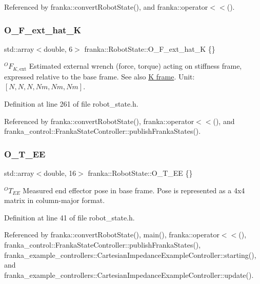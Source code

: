 Referenced by franka\+::convert\+Robot\+State(), and franka\+::operator$<$$<$().

\mbox{\label{structfranka_1_1RobotState_a5a830b4f9d6a3c2dc92e4a9cc6050493}} 
\subsubsection{\texorpdfstring{O\+\_\+\+F\+\_\+ext\+\_\+hat\+\_\+K}{O\_F\_ext\_hat\_K}}
{\footnotesize\ttfamily std\+::array$<$double, 6$>$ franka\+::\+Robot\+State\+::\+O\+\_\+\+F\+\_\+ext\+\_\+hat\+\_\+K \{\}}

$^OF_{K,\text{ext}}$ Estimated external wrench (force, torque) acting on stiffness frame, expressed relative to the base frame. See also \hyperlink{classfranka_1_1Robot_k-frame}{K frame}. Unit\+: $[N,N,N,Nm,Nm,Nm]$. 

Definition at line 261 of file robot\+\_\+state.\+h.



Referenced by franka\+::convert\+Robot\+State(), franka\+::operator$<$$<$(), and franka\+\_\+control\+::\+Franka\+State\+Controller\+::publish\+Franka\+States().

\mbox{\label{structfranka_1_1RobotState_a193781d47722b32925e0ea7ac415f442}} 
\subsubsection{\texorpdfstring{O\+\_\+\+T\+\_\+\+EE}{O\_T\_EE}}
{\footnotesize\ttfamily std\+::array$<$double, 16$>$ franka\+::\+Robot\+State\+::\+O\+\_\+\+T\+\_\+\+EE \{\}}

$^{O}T_{EE}$ Measured end effector pose in base frame. Pose is represented as a 4x4 matrix in column-\/major format. 

Definition at line 41 of file robot\+\_\+state.\+h.



Referenced by franka\+::convert\+Robot\+State(), main(), franka\+::operator$<$$<$(), franka\+\_\+control\+::\+Franka\+State\+Controller\+::publish\+Franka\+States(), franka\+\_\+example\+\_\+controllers\+::\+Cartesian\+Impedance\+Example\+Controller\+::starting(), and franka\+\_\+example\+\_\+controllers\+::\+Cartesian\+Impedance\+Example\+Controller\+::update().

